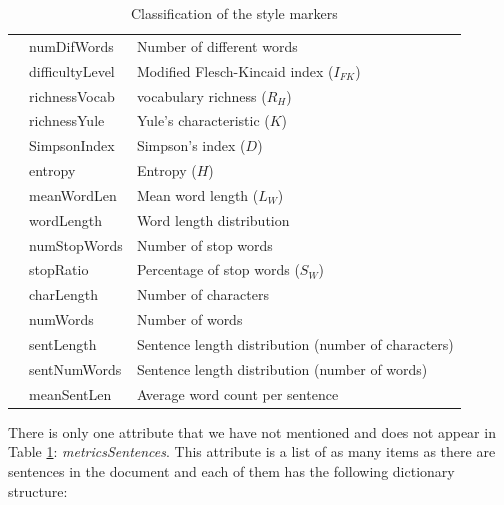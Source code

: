 \begin{table}[h]
\begin{tabular}{|l|ll|}
		& numDifWords                    & Number of different words                           \\ \cline{2-3} 
		& difficultyLevel                & Modified Flesch-Kincaid index ($I_{FK}$)                       \\ \cline{2-3} 
		& richnessVocab                  & \cite{honore1979some} vocabulary richness ($R_H$)                                     \\ \cline{2-3} 
		& richnessYule                   & Yule's characteristic ($K$)                               \\ \cline{2-3} 
		& SimpsonIndex                   & Simpson's index ($D$)                                     \\ \cline{2-3} 
		& entropy                        & Entropy ($H$)                                             \\ \cline{2-3} 
		& meanWordLen                    & Mean word length ($L_W$)                                    \\ \cline{2-3} 
		& wordLength                     & Word length distribution                            \\ \cline{2-3} 
		& numStopWords                   & Number of stop words                                \\ \cline{2-3} 
		& stopRatio                      & Percentage of stop words ($S_W$)                            \\ \hhline{|=|=|=|}
		\multirow{5}{*}{Structural}            & charLength                     & Number of characters                                \\ \cline{2-3} 
		& numWords                       & Number of words                                     \\ \cline{2-3} 
		& sentLength                     & Sentence length distribution (number of characters) \\ \cline{2-3} 
		& sentNumWords                   & Sentence length distribution (number of words)      \\ \cline{2-3} 
		& meanSentLen                    & Average word count per sentence                     \\ \hline
	\end{tabular}
\caption{Classification of the style markers}\label{tab:sty}
\end{table}

There is only one attribute that we have not mentioned and does not appear in Table \ref{tab:sty}: \textit{metricsSentences}. This attribute is a list of as many items as there are sentences in the document and each of them has the following dictionary structure:

